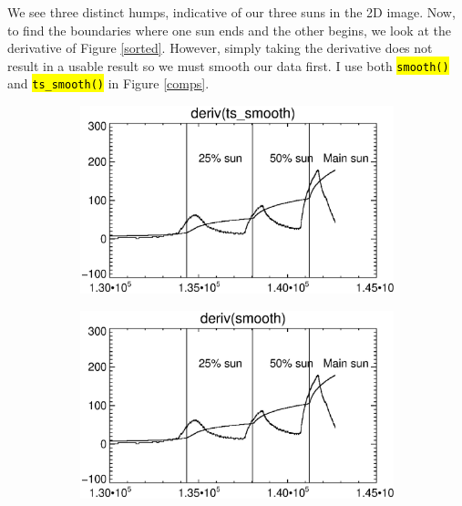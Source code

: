\documentclass[10pt]{scrartcl}
\begin{document}
We see three distinct humps, indicative of our three suns in the 2D image. Now, to find the boundaries where one sun ends and the other begins, we look at the derivative of Figure \ref{sorted}. However, simply taking the derivative does not result in a usable result so we must smooth our data first. I use both \texttt{\hl{smooth()}} and \texttt{\hl{ts\_smooth()}} in Figure \ref{comps}.

\begin{figure}[!ht]
    \centering 
    \hspace{-1.0in}
    \begin{subfigure}[b]{.45\linewidth}
        \centering
        \includegraphics[width=1.3\textwidth]{../plots_tables_images/d_ts.eps}
    \end{subfigure}
    \hspace{.5in}
    \begin{subfigure}[b]{.45\linewidth}
        \centering
        \includegraphics[width=1.3\textwidth]{../plots_tables_images/d_reg.eps}
    \end{subfigure}
   

\end{figure}
\end{document}
